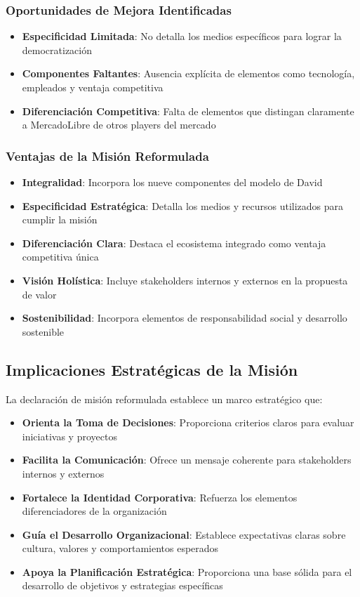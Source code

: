 \subsubsection{Oportunidades de Mejora Identificadas}
\begin{itemize}
\item \textbf{Especificidad Limitada}: No detalla los medios específicos para lograr la democratización
\item \textbf{Componentes Faltantes}: Ausencia explícita de elementos como tecnología, empleados y ventaja competitiva
\item \textbf{Diferenciación Competitiva}: Falta de elementos que distingan claramente a MercadoLibre de otros players del mercado
\end{itemize}

\subsubsection{Ventajas de la Misión Reformulada}
\begin{itemize}
\item \textbf{Integralidad}: Incorpora los nueve componentes del modelo de David
\item \textbf{Especificidad Estratégica}: Detalla los medios y recursos utilizados para cumplir la misión
\item \textbf{Diferenciación Clara}: Destaca el ecosistema integrado como ventaja competitiva única
\item \textbf{Visión Holística}: Incluye stakeholders internos y externos en la propuesta de valor
\item \textbf{Sostenibilidad}: Incorpora elementos de responsabilidad social y desarrollo sostenible
\end{itemize}

\subsection{Implicaciones Estratégicas de la Misión}

La declaración de misión reformulada establece un marco estratégico que:

\begin{itemize}
\item \textbf{Orienta la Toma de Decisiones}: Proporciona criterios claros para evaluar iniciativas y proyectos
\item \textbf{Facilita la Comunicación}: Ofrece un mensaje coherente para stakeholders internos y externos
\item \textbf{Fortalece la Identidad Corporativa}: Refuerza los elementos diferenciadores de la organización
\item \textbf{Guía el Desarrollo Organizacional}: Establece expectativas claras sobre cultura, valores y comportamientos esperados
\item \textbf{Apoya la Planificación Estratégica}: Proporciona una base sólida para el desarrollo de objetivos y estrategias específicas
\end{itemize}
